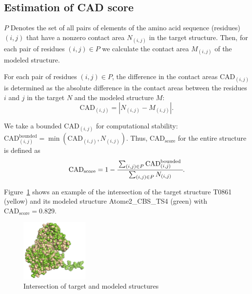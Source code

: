 \documentclass[12pt,twosides]{extarticle}
\begin{document}
\subsection{Estimation of CAD score~\cite{Olechnovic2013CADscoreAN}}

$P$ Denotes the set of all pairs of elements of the amino acid sequence (residues) $(i, j)$ that have a nonzero contact area $N_{(i, j)}$ in the target structure. Then, for each pair of residues $ (i, j) \in P $ we calculate the contact area $ M_{(i, j)} $ of the modeled structure.

For each pair of residues $ (i, j) \in P $, the difference in the contact areas $ \mathrm{CAD}_{(i, j)}$ is determined as the absolute difference in the contact areas between the residues $ i $ and $ j $ in the target $ N $ and the modeled structure $ M $:
$$\mathrm{CAD}_{(i, j)}=\left|N_{(i, j)}-M_{(i, j)}\right|.$$

We take a bounded $\mathrm{CAD}_{(i, j)}$ for computational stability: $\mathrm{CAD}_{(i, j)}^{\text {bounded}}=\min \left(\mathrm{CAD}_{(i, j)}, N_{(i, j)}\right)$. Thus, $\text{CAD}_\text{score}$ for the entire structure is defined as
\begin{align}
\mathrm{CAD}_\text{score}=1-\cfrac{\sum_{(i, j) \in P} \mathrm{CAD}_{(i, j)}^{\text {bounded }}}{\sum_{(i, j) \in P} N_{(i, j)}}.
\label{CAD_score}
\end{align}

Figure~\ref{CAD_example} shows an example of the intersection of the target structure T0861 (yellow) and its modeled structure Atome2\_CBS\_TS4 (green) with $\mathrm{CAD}_\text{score}=0.829$.
\begin{figure}[h]
	\centering
	\includegraphics[width=0.3\textwidth]{T0861_Atome2_CBS_TS4.pdf}
	\caption{Intersection of target and modeled structures}
	\label{CAD_example}
\end{figure}
\end{document}
